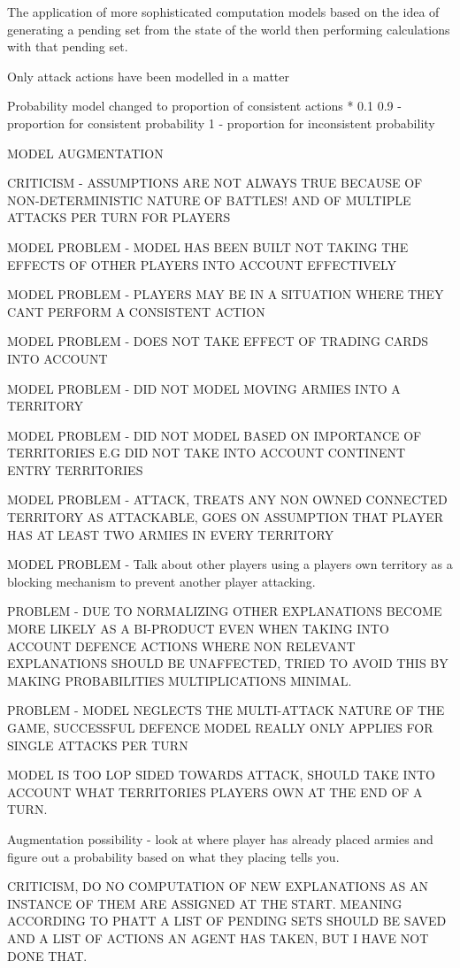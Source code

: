 \documentclass[parskip]{cs4rep}
\begin{document}
The application of more sophisticated computation models based on the idea of generating a pending set from the state of the world then performing calculations with that pending set.

Only attack actions have been modelled in a matter 

Probability model changed to proportion of consistent actions * 0.1 
0.9 - proportion for consistent probability
1 - proportion for inconsistent probability

MODEL AUGMENTATION

CRITICISM - ASSUMPTIONS ARE NOT ALWAYS TRUE BECAUSE OF NON-DETERMINISTIC NATURE OF BATTLES! AND OF MULTIPLE ATTACKS PER TURN FOR PLAYERS

MODEL PROBLEM - MODEL HAS BEEN BUILT NOT TAKING THE EFFECTS OF OTHER PLAYERS INTO ACCOUNT EFFECTIVELY

MODEL PROBLEM - PLAYERS MAY BE IN A SITUATION WHERE THEY CANT PERFORM A CONSISTENT ACTION

MODEL PROBLEM - DOES NOT TAKE EFFECT OF TRADING CARDS INTO ACCOUNT

MODEL PROBLEM - DID NOT MODEL MOVING ARMIES INTO A TERRITORY

MODEL PROBLEM - DID NOT MODEL BASED ON IMPORTANCE OF TERRITORIES E.G DID NOT TAKE INTO ACCOUNT CONTINENT ENTRY TERRITORIES

MODEL PROBLEM - ATTACK, TREATS ANY NON OWNED CONNECTED TERRITORY AS ATTACKABLE, GOES ON ASSUMPTION THAT PLAYER HAS AT LEAST TWO ARMIES IN EVERY TERRITORY

MODEL PROBLEM - Talk about other players using a players own territory as a blocking mechanism to prevent another player attacking.

PROBLEM - DUE TO NORMALIZING OTHER EXPLANATIONS BECOME MORE LIKELY AS A BI-PRODUCT EVEN WHEN TAKING INTO ACCOUNT DEFENCE ACTIONS WHERE NON RELEVANT EXPLANATIONS SHOULD BE UNAFFECTED, TRIED TO AVOID THIS BY MAKING PROBABILITIES MULTIPLICATIONS MINIMAL.

PROBLEM - MODEL NEGLECTS THE MULTI-ATTACK NATURE OF THE GAME, SUCCESSFUL DEFENCE MODEL REALLY ONLY APPLIES FOR SINGLE ATTACKS PER TURN

MODEL IS TOO LOP SIDED TOWARDS ATTACK, SHOULD TAKE INTO ACCOUNT WHAT TERRITORIES PLAYERS OWN AT THE END OF A TURN.

Augmentation possibility - look at where player has already placed armies and figure out a probability based on what they placing tells you.

CRITICISM, DO NO COMPUTATION OF NEW EXPLANATIONS AS AN INSTANCE OF THEM ARE ASSIGNED AT THE START. MEANING ACCORDING TO PHATT A LIST OF PENDING SETS SHOULD BE SAVED AND A LIST OF ACTIONS AN AGENT HAS TAKEN, BUT I HAVE NOT DONE THAT.
\end{document}

